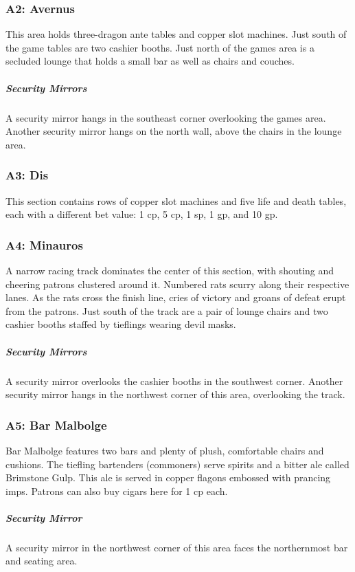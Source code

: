 \documentclass[10pt,a4paper,twoside,bg=print,twocolumn,openany,nodeprecatedcode]{dndbook}
\begin{document}
\subsubsection{A2: Avernus}
This area holds three-dragon ante tables and copper slot machines. Just south of the game tables are two cashier booths. Just north of the games area is a secluded lounge that holds a small bar as well as chairs and couches.

\subparagraph{Security Mirrors}
A security mirror hangs in the southeast corner overlooking the games area. Another security mirror hangs on the north wall, above the chairs in the lounge area.

\subsubsection{A3: Dis}
This section contains rows of copper slot machines and five life and death tables, each with a different bet value: 1 cp, 5 cp, 1 sp, 1 gp, and 10 gp.

\subsubsection{A4: Minauros}
\begin{DndReadAloud}{}
A narrow racing track dominates the center of this section, with shouting and cheering patrons clustered around it. Numbered rats scurry along their respective lanes. As the rats cross the finish line, cries of victory and groans of defeat erupt from the patrons. Just south of the track are a pair of lounge chairs and two cashier booths staffed by tieflings wearing devil masks.

\end{DndReadAloud}

\subparagraph{Security Mirrors}
A security mirror overlooks the cashier booths in the southwest corner. Another security mirror hangs in the northwest corner of this area, overlooking the track.

\subsubsection{A5: Bar Malbolge}
Bar Malbolge features two bars and plenty of plush, comfortable chairs and cushions. The tiefling bartenders (commoners) serve spirits and a bitter ale called Brimstone Gulp. This ale is served in copper flagons embossed with prancing imps. Patrons can also buy cigars here for 1 cp each.

\subparagraph{Security Mirror}
A security mirror in the northwest corner of this area faces the northernmost bar and seating area.
\end{document}
